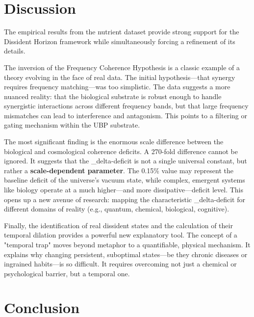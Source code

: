 \documentclass[12pt, a4paper]{article}
\begin{document}
\section{Discussion}

The empirical results from the nutrient dataset provide strong support for the Dissident Horizon framework while simultaneously forcing a refinement of its details. 

The inversion of the Frequency Coherence Hypothesis is a classic example of a theory evolving in the face of real data. The initial hypothesis—that synergy requires frequency matching—was too simplistic. The data suggests a more nuanced reality: that the biological substrate is robust enough to handle synergistic interactions across different frequency bands, but that large frequency mismatches can lead to interference and antagonism. This points to a filtering or gating mechanism within the UBP substrate.

The most significant finding is the enormous scale difference between the biological and cosmological coherence deficits. A 270-fold difference cannot be ignored. It suggests that the \_delta-deficit is not a single universal constant, but rather a \textbf{scale-dependent parameter}. The 0.15\% value may represent the baseline deficit of the universe’s vacuum state, while complex, emergent systems like biology operate at a much higher—and more dissipative—deficit level. This opens up a new avenue of research: mapping the characteristic \_delta-deficit for different domains of reality (e.g., quantum, chemical, biological, cognitive).

Finally, the identification of real dissident states and the calculation of their temporal dilation provides a powerful new explanatory tool. The concept of a "temporal trap" moves beyond metaphor to a quantifiable, physical mechanism. It explains why changing persistent, suboptimal states—be they chronic diseases or ingrained habits—is so difficult. It requires overcoming not just a chemical or psychological barrier, but a temporal one.

\section{Conclusion}
\end{document}
